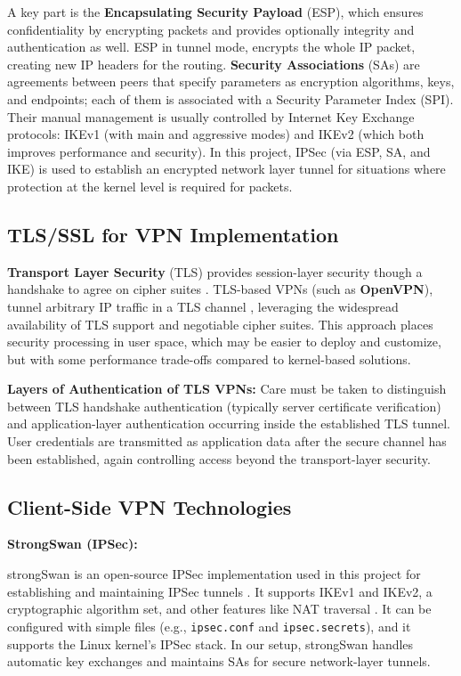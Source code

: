 \noindent
A key part is the \textbf{Encapsulating Security Payload} (ESP), which ensures confidentiality by encrypting packets and provides optionally integrity and authentication as well. ESP in tunnel mode, encrypts the whole IP packet, creating new IP headers for the routing. \textbf{Security Associations} (SAs) are agreements between peers that specify parameters as encryption algorithms, keys, and endpoints; each of them is associated with a Security Parameter Index (SPI). Their manual management is usually controlled by Internet Key Exchange protocols: IKEv1 (with main and aggressive modes) and IKEv2 (which both improves performance and security). In this project, IPSec (via ESP, SA, and IKE) is used to establish an encrypted network layer tunnel for situations where protection at the kernel level is required for packets.

\subsection{TLS/SSL for VPN Implementation}

\textbf{Transport Layer Security} (TLS) provides session-layer security though a handshake to agree on cipher suites \cite{rfc8446}. TLS-based VPNs (such as \textbf{OpenVPN}), tunnel arbitrary IP traffic in a TLS channel \cite{openvpn_official}, leveraging the widespread availability of TLS support and negotiable cipher suites. This approach places security processing in user space, which may be easier to deploy and customize, but with some performance trade-offs compared to kernel-based solutions.

\textbf{Layers of Authentication of TLS VPNs:} Care must be taken to distinguish between TLS handshake authentication (typically server certificate verification) and application-layer authentication occurring inside the established TLS tunnel. User credentials are transmitted as application data after the secure channel has been established, again controlling access beyond the transport-layer security.

\subsection{Client-Side VPN Technologies}

\textbf{StrongSwan (IPSec):}

\noindent
strongSwan is an open-source IPSec implementation used in this project for establishing and maintaining IPSec tunnels \cite{strongswan_official, strongswan_docs}. It supports IKEv1 and IKEv2, a cryptographic algorithm set, and other features like NAT traversal \cite{rfc3948}. It can be configured with simple files (e.g., \texttt{ipsec.conf} and \texttt{ipsec.secrets}), and it supports the Linux kernel’s IPSec stack. In our setup, strongSwan handles automatic key exchanges and maintains SAs for secure network-layer tunnels.\\

